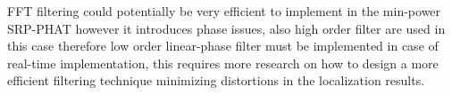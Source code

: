 FFT filtering could potentially be very efficient to implement in the min-power SRP-PHAT however it introduces phase issues, also high order filter are used in this case therefore low order linear-phase filter must be implemented in case of real-time implementation, this requires more research on how to design a more efficient filtering technique minimizing distortions in the localization results. 



